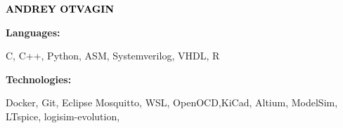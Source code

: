 \documentclass[9pt]{developercv} %
\begin{document}

\begin{minipage}[t]{0.5\textwidth} 
	\vspace{-\baselineskip} %
	
	{ \fontsize{16}{20} \textcolor{black}{\textbf{\MakeUppercase{Andrey Otvagin}}}} %
	
	\vspace{6pt}
    \hspace{22pt}

    \hspace{22pt}
    
    \hspace{22pt}

    
\end{minipage}
\hfill
\begin{minipage}[t]{0.5\textwidth}
    \vspace{-18pt}
    \vspace{-6pt}
    
    \begin{minipage}[t]{0.2\textwidth}
        \textbf{Languages:}
    \end{minipage}
    \hfill
    \begin{minipage}[t]{0.73\textwidth}
        C, C++, Python, ASM, Systemverilog, VHDL, R
    \end{minipage}
    \vspace{4mm}
    
    \begin{minipage}[t]{0.2\textwidth}
        \textbf{Technologies:}
    \end{minipage}
    \hfill
    \begin{minipage}[t]{0.73\textwidth}
        Docker, Git, Eclipse Mosquitto, WSL, OpenOCD,KiCad, Altium, ModelSim, LTspice, logisim-evolution, 
    \end{minipage}
    
\end{minipage}


\vspace{-4 pt}
\begin{entrylist}
    
\end{entrylist}
\end{document}
